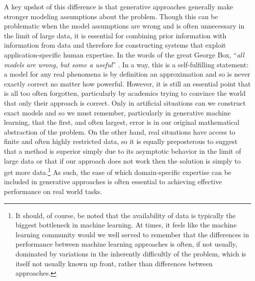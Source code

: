 A key upshot of this difference
is that generative approaches generally make stronger modeling assumptions about the problem.  Though
this can be problematic when the model assumptions are wrong and is often unnecessary in
the limit of large data, it is essential for combining prior information with information from data
and therefore for constructing systems that exploit application-specific human expertise.
In the words of the great George Box, ``\textit{all models are wrong, but some a useful}''
\citep{box1979robustness,box2005statistics}.  In a way, this is a self-fulfilling statement: a model for
any real phenomena
is by definition an approximation and so is never exactly correct no matter how powerful.  However,
it is still an essential point that is all too often forgotten, particularly by academics trying to convince
the world that only their approach is correct.  Only in artificial situations can we construct exact models
and so we must remember, particularly in generative machine learning, that the first, and often largest,
error is in our original mathematical abstraction of the problem.  On the other hand, real situations
have access to finite and often highly restricted data, so it is equally preposterous to suggest that a
method is superior simply due to its asymptotic behavior in the limit of large data or that if our approach
does not work then the solution is simply to get more data.\footnote{It should, of course, be noted
	that the availability of data is typically the biggest bottleneck in machine learning.  At times, it feels 
	like the machine learning community would we well served to remember that the differences in performance between
	machine learning approaches is often, if not usually, dominated by variations in the inherently difficultly of the
	problem, which is itself not usually known up front, rather than differences between approaches.}  As such, the ease of which domain-specific
expertise can be included in generative approaches is often essential to achieving effective performance
on real world tasks.

